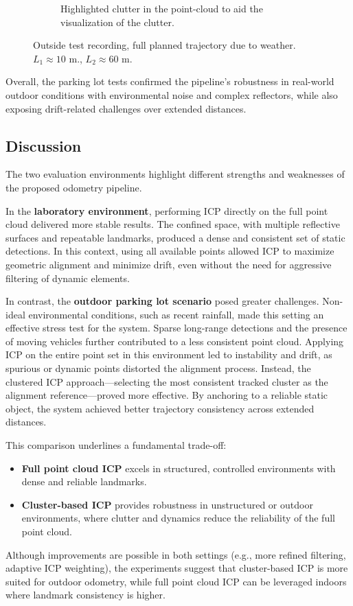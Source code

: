 \begin{figure}[!htbp]
\begin{subfigure}{0.48\linewidth}
        \caption{Highlighted clutter in the point-cloud to aid the visualization of the clutter.}
        \label{fig:highlightedClutter}
    \end{subfigure}
    \caption{Outside test recording, full planned trajectory due to weather. $L_1 \approx 10$ m., $L_2 \approx 60$ m. }
    \label{fig:outsideClutterRecording}
\end{figure}

Overall, the parking lot tests confirmed the pipeline's robustness in real-world outdoor conditions with environmental noise and complex reflectors, while also exposing drift-related challenges over extended distances.

\vspace{2\baselineskip}

\subsection{Discussion}
The two evaluation environments highlight different strengths and weaknesses of the proposed odometry pipeline.  

In the \textbf{laboratory environment}, performing ICP directly on the full point cloud delivered more stable results.  
The confined space, with multiple reflective surfaces and repeatable landmarks, produced a dense and consistent set of static detections.  
In this context, using all available points allowed ICP to maximize geometric alignment and minimize drift, even without the need for aggressive filtering of dynamic elements.  

In contrast, the \textbf{outdoor parking lot scenario} posed greater challenges.  
Non-ideal environmental conditions, such as recent rainfall, made this setting an effective stress test for the system.  
Sparse long-range detections and the presence of moving vehicles further contributed to a less consistent point cloud.  
Applying ICP on the entire point set in this environment led to instability and drift, as spurious or dynamic points distorted the alignment process.  
Instead, the clustered ICP approach—selecting the most consistent tracked cluster as the alignment reference—proved more effective.  
By anchoring to a reliable static object, the system achieved better trajectory consistency across extended distances.  

This comparison underlines a fundamental trade-off:
\begin{itemize}
    \item \textbf{Full point cloud ICP} excels in structured, controlled environments with dense and reliable landmarks.
    \item \textbf{Cluster-based ICP} provides robustness in unstructured or outdoor environments, where clutter and dynamics reduce the reliability of the full point cloud.
\end{itemize}

Although improvements are possible in both settings (e.g., more refined filtering, adaptive ICP weighting), the experiments suggest that cluster-based ICP is more suited for outdoor odometry, while full point cloud ICP can be leveraged indoors where landmark consistency is higher.
